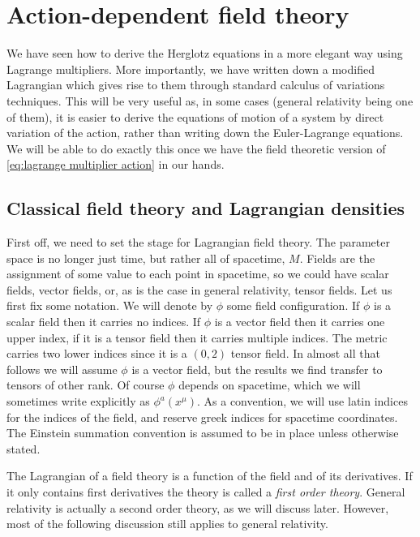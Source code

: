 \documentclass[../main.tex]{subfiles}
\begin{document}
\section{Action-dependent field theory}
We have seen how to derive the Herglotz equations in a more elegant way using Lagrange
multipliers. More importantly, we have written down a modified Lagrangian which gives rise
to them through standard calculus of variations techniques. This will be very useful as,
in some cases (general relativity being one of them), it is easier to derive the equations
of motion of a system by direct variation of the action, rather than writing down the
Euler-Lagrange equations. We will be able to do exactly this once we have the field
theoretic version of \cref{eq:lagrange multiplier action} in our hands.

\subsection{Classical field theory and Lagrangian densities}\label{sec:lagrangian
densities}
First off, we need to set the stage for Lagrangian field theory. The parameter space is no
longer just time, but rather all of spacetime, \( M \). Fields are the assignment of some
value to each point in spacetime, so we could have scalar fields, vector fields, or, as is
the case in general relativity, tensor fields. Let us first fix some notation. We will
denote by \( \phi \) some field configuration. If \( \phi \) is a scalar field then it
carries no indices. If \( \phi \) is a vector field then it carries one upper index, if it is a
tensor field then it carries multiple indices. The metric carries two lower indices since
it is a \( (0,2) \) tensor field. In almost all that follows we will assume \( \phi \) is
a vector field, but the results we find transfer to tensors of other rank. Of
course \( \phi \) depends on spacetime, which we will sometimes write explicitly as \(
\phi^a(x^\mu) \). As a convention, we will use latin indices for the indices of the field,
and reserve greek indices for spacetime coordinates. The Einstein summation convention is
assumed to be in place unless otherwise stated. 

The Lagrangian of a field theory is a function of the field and of its derivatives. If it
only contains first derivatives the theory is called a \emph{first order theory}. General
relativity is actually a second order theory, as we will discuss later. However, most of
the following discussion still applies to general relativity. 
\end{document}
